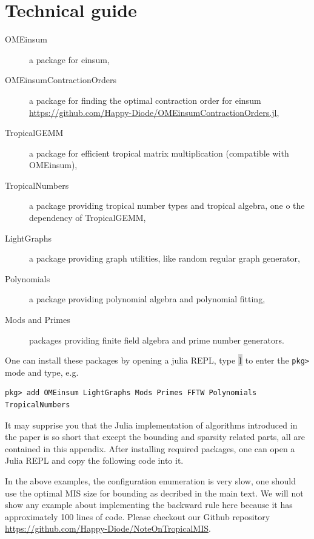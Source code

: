 \documentclass{article}
\newcommand{\<}{\langle}
\renewcommand{\>}{\rangle}
\theoremstyle{definition}\newtheorem{definition}{\textit{Definition}}
\begin{document}
\section{Technical guide}\label{sec:technical}
\begin{description}
	\item[OMEinsum] a package for einsum,
	\item[OMEinsumContractionOrders] a package for finding the optimal contraction order for einsum \\ \href{https://github.com/Happy-Diode/OMEinsumContractionOrders.jl}{https://github.com/Happy-Diode/OMEinsumContractionOrders.jl},
	\item[TropicalGEMM] a package for efficient tropical matrix multiplication (compatible with OMEinsum),
	\item[TropicalNumbers] a package providing tropical number types and tropical algebra, one o the dependency of TropicalGEMM,
	\item[LightGraphs] a package providing graph utilities, like random regular graph generator,
	\item[Polynomials] a package providing polynomial algebra and polynomial fitting,
	\item[Mods and Primes] packages providing finite field algebra and prime number generators.
\end{description}

One can install these packages by opening a julia REPL, type \colorbox{lightgray}{\texttt{]}} to enter the \texttt{pkg>} mode and type, e.g.
\begin{lstlisting}
pkg> add OMEinsum LightGraphs Mods Primes FFTW Polynomials TropicalNumbers
\end{lstlisting}

It may supprise you that the Julia implementation of algorithms introduced in the paper is so short that except the bounding and sparsity related parts,
all are contained in this appendix. After installing required packages, one can open a Julia REPL and copy the following code into it.



In the above examples, the configuration enumeration is very slow, one should use the optimal MIS size for bounding as decribed in the main text.
We will not show any example about implementing the backward rule here because it has approximately 100 lines of code.
Please checkout our Github repository \href{https://github.com/Happy-Diode/NoteOnTropicalMIS}{https://github.com/Happy-Diode/NoteOnTropicalMIS}.
\end{document}
